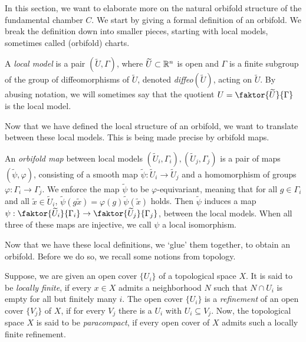 In this section, we want to elaborate more on the natural orbifold structure of the fundamental chamber \(C\).
We start by giving a formal definition of an orbifold.
We break the definition down into smaller pieces, starting with local models, sometimes called (orbifold) charts.

\begin{definition}
    A \emph{local model} is a pair \((\widetilde{U}, \Gamma)\), where \(\widetilde{U} \subset \mathbb{R}^n\) is open and \(\Gamma\) is a finite subgroup of the group of diffeomorphisms of \(\widetilde{U}\), denoted \emph{diffeo}\((\widetilde{U})\), acting on \(\widetilde{U}\).
    By abusing notation, we will sometimes say that the quotient \(U = \faktor{\widetilde{U}}{\Gamma}\;\) is the local model.
\end{definition}

Now that we have defined the local structure of an orbifold, we want to translate between these local models.
This is being made precise by orbifold maps.

\begin{definition}
    An \emph{orbifold map} between local models \((\widetilde{U}_i, \Gamma_i), (\widetilde{U}_j, \Gamma_j)\) is a pair of maps \((\widetilde{\psi}, \varphi)\),
    consisting of a smooth map \(\widetilde{\psi} : \widetilde{U}_i \to \widetilde{U}_j\) and a homomorphism of groups \(\varphi : \Gamma_i \to \Gamma_j\).
    We enforce the map \(\widetilde{\psi}\) to be \(\varphi\)-equivariant, meaning that for all \(g \in \Gamma_i\) and all \(\widetilde{x} \in \widetilde{U}_i\), \(\widetilde{\psi}(g\widetilde{x}) = \varphi(g)\widetilde{\psi}(\widetilde{x})\) holds.
    Then \(\widetilde{\psi}\) induces a map \(\psi : \faktor{\widetilde{U}_i}{\Gamma_i} \to \faktor{\widetilde{U}_j}{\Gamma_j}\), between the local models.
    When all three of these maps are injective, we call \(\psi\) a local isomorphism.
\end{definition}

Now that we have these local definitions, we `glue' them together, to obtain an orbifold.
Before we do so, we recall some notions from topology.

Suppose, we are given an open cover \(\{U_i\}\) of a topological space \(X\).
It is said to be \emph{locally finite}, if every \(x \in X\) admits a neighborhood \(N\) such that \(N \cap U_i\) is empty for all but finitely many \(i\).
The open cover \(\{U_i\}\) is a \emph{refinement} of an open cover \(\{V_j\}\) of \(X\), if for every \(V_j\) there is a \(U_i\) with \(U_i \subseteq V_j\).
Now, the topological space \(X\) is said to be \emph{paracompact}, if every open cover of \(X\) admits such a locally finite refinement.

